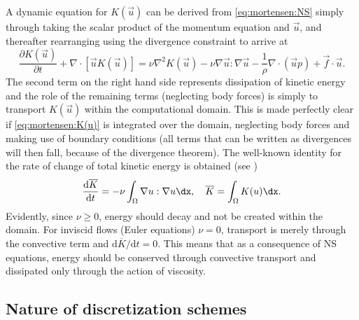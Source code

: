 A dynamic equation for $K(\vec{u})$ can be derived from
\eqref{eq:mortensen:NS} simply through taking the scalar product of the
momentum equation and $\vec{u}$, and thereafter rearranging using the
divergence constraint to arrive at
\begin{equation}
 \frac{\partial K(\vec{u})}{\partial t} + \nabla \cdot [\vec{u}K(\vec{u})]
        = \nu \nabla^2 K(\vec{u}) -\nu \nabla \vec{u} : \nabla \vec{u}
      - \frac{1}{\rho}\nabla \cdot \left(\vec{u}p \right) +\vec{f}\cdot \vec{u}.
 \label{eq:mortensen:K(u)}
\end{equation}
The second term on the right hand side represents dissipation of kinetic
energy and the role of the remaining terms (neglecting body forces) is
simply to transport $K(\vec{u})$ within the computational domain. This
is made perfectly clear if \eqref{eq:mortensen:K(u)} is integrated over
the domain, neglecting body forces and making use of boundary conditions
(all terms that can be written as divergences will then fall, because of
the divergence theorem). The well-known identity for the rate of change
of total kinetic energy is obtained (see \citet{SimoArmero1994})
\begin{equation}
 \frac{\text{d} \overline{K} }{\text{d} t} = - \nu \int_\Omega \nabla
 \vec{u} : \nabla \vec{u} \dx,
\quad \overline{K} = \int_{\Omega} K(\vec{u}) \dx .
\end{equation}
Evidently, since $\nu \ge 0$, energy should decay and not be created
within the domain. For inviscid flows (Euler equations) $\nu=0$, transport
is merely through the convective term and $\text{d} \overline{K}/\text{d}
t = 0$. This means that as a consequence of NS equations, energy should
be conserved through convective transport and dissipated only through
the action of viscosity.


\subsection{Nature of discretization schemes}
\label{sec:mortensen:dissipative:dispersive}

